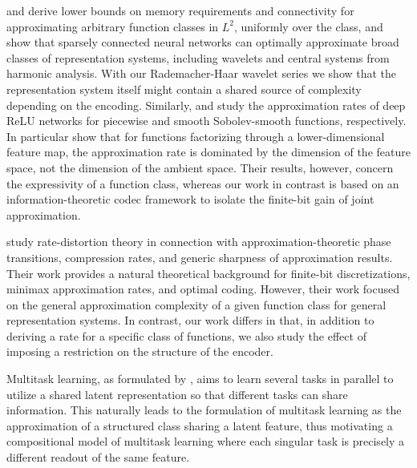 \documentclass[twoside,11pt]{article}
\begin{document}
\cite{Bolcskei19OptimalApproximationSparsely} and \cite{elbrachter2021deep} derive lower bounds on memory requirements and connectivity for approximating arbitrary function classes in $L^2$, uniformly over the class, and show that sparsely connected neural networks can optimally approximate broad classes of representation systems, including wavelets and central systems from harmonic analysis. With our Rademacher-Haar wavelet series we show that the representation system itself might contain a shared source of complexity depending on the encoding. Similarly, \cite{Petersen18OptimalApproximationPiecewise} and \cite{Yarotsky17ErrorBoundsApproximations} study the approximation rates of deep ReLU networks for piecewise and smooth Sobolev-smooth functions, respectively. In particular \cite{Petersen18OptimalApproximationPiecewise} show that for functions factorizing through a lower-dimensional feature map, the approximation rate is dominated by the dimension of the feature space, not the dimension of the ambient space. Their results, however, concern the expressivity of a function class, whereas our work in contrast is based on an information-theoretic codec framework to isolate the finite-bit gain of joint approximation.

\cite{Grohs23PhaseTransitionsRate} study rate-distortion theory in connection with approximation-theoretic phase transitions, compression rates, and generic sharpness of approximation results. Their work provides a natural theoretical background for finite-bit discretizations, minimax approximation rates, and optimal coding. However, their work focused on the general approximation complexity of a given function class for general representation systems. In contrast, our work differs in that, in addition to deriving a rate for a specific class of functions, we also study the effect of imposing a restriction on the structure of the encoder.

Multitask learning, as formulated by \cite{Caruana97MultitaskLearning}, aims to learn several tasks in parallel to utilize a shared latent representation so that different tasks can share information. This naturally leads to the formulation of multitask learning as the approximation of a structured class sharing a latent feature, thus motivating a compositional model of multitask learning where each singular task is precisely a different readout of the same feature.
\end{document}
